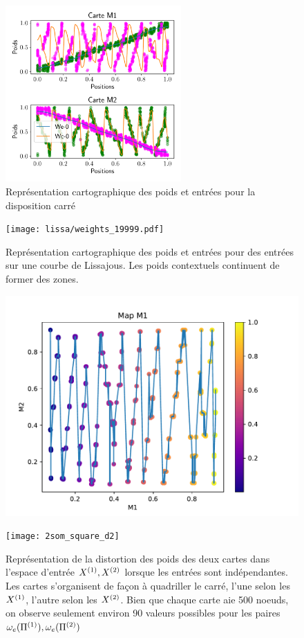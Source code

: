 \documentclass[../main]{subfiles}
\begin{document}
\begin{figure}
	\centering\includegraphics[width=0.6\textwidth]{2som_square_w.pdf}
	\caption{Représentation cartographique des poids et entrées pour la disposition carré}
\end{figure}

\begin{figure}
	\centering\texttt{[image: lissa/weights\_19999.pdf]}
	\caption{Représentation cartographique des poids et entrées pour des entrées sur une courbe de Lissajous. Les poids contextuels continuent de former des zones.}
\end{figure}

\begin{figure}
	\begin{minipage}{0.48\textwidth}
		\includegraphics[width=\textwidth]{2som_square_d}
	\end{minipage}
	\begin{minipage}{0.48\textwidth}
		\texttt{[image: 2som\_square\_d2]}
	\end{minipage}
	\caption{Représentation de la distortion des poids des deux cartes dans l'espace d'entrée $X^{({1})}, X^{({2})}$ lorsque les entrées sont indépendantes. Les cartes s'organisent de façon à quadriller le carré, l'une selon les $X^{({1})}$, l'autre selon les $X^{({2})}$. Bien que chaque carte aie 500 noeuds, on observe seulement environ 90 valeurs possibles pour les paires $\omega_e(\Pi^{({1})}),\omega_e(\Pi^{({2})})$ \label{2som_p_d}}
\end{figure}
\end{document}
